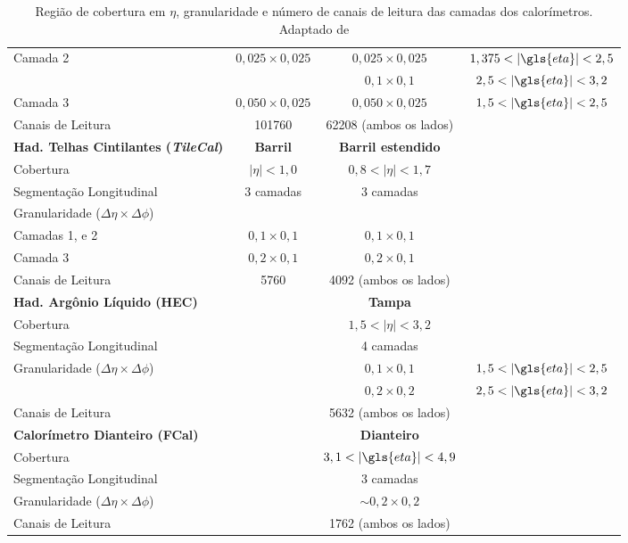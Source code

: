 \begin{table}[p]
{\begin{tabular}{p{5cm} c c c}
  Camada 2  & $0,025 \times 0,025$ & $0,025 \times 0,025$   & $1,375 <
|\gls{eta}| < 2,5$ \\
            &                      & $0,1 \times 0,1$      & $2,5   <
|\gls{eta}| < 3,2$ \\
  Camada 3  & $0,050 \times 0,025$ & $0,050 \times 0,025$  & $1,5   <
|\gls{eta}| < 2,5$ \\
  Canais de Leitura & 101760 & 62208 (ambos os lados)\\
   \hline
   \hline
  \textbf{Had. Telhas Cintilantes (\emph{TileCal})}    & \textbf{Barril}  & \textbf{Barril
estendido}     \\  \hline
  Cobertura   &  $|\eta|<1,0$ & $0,8<|\eta|<1,7$   \\
  Segmentação Longitudinal & 3 camadas  & 3 camadas  \\
  Granularidade ($\Delta \eta \times \Delta \phi$)& &  \\
  Camadas 1, e 2    &  $0,1 \times 0,1$ & $0,1 \times 0,1$   \\
  Camada 3   &  $0,2 \times 0,1$ & $0,2 \times 0,1$   \\
  Canais de Leitura & 5760 & 4092 (ambos os lados)\\
  \hline
  \hline
  \textbf{Had. Argônio Líquido (HEC)}    &  &  \textbf{Tampa}     \\  \hline
  Cobertura   &   & $1,5<|\eta|<3,2$  \\
  Segmentação Longitudinal &   & 4 camadas  \\
  Granularidade ($\Delta \eta \times \Delta \phi$)& & $0,1 \times 0,1 $ & $1,5 <
|\gls{eta}| < 2,5$ \\
  & & $0,2 \times 0,2 $ & $ 2,5 < |\gls{eta}| < 3,2$ \\
  Canais de Leitura & & 5632 (ambos os lados)\\
  \hline
  \hline
  \textbf{Calorímetro Dianteiro (FCal)}    &  &   \textbf{Dianteiro}    \\  \hline
  Cobertura   &  & $ 3,1 < |\gls{eta}| < 4,9 $ \\
  Segmentação Longitudinal &   & 3 camadas  \\
  Granularidade ($\Delta \eta \times \Delta \phi$)& & $\sim0,2 \times 0,2$  \\
  Canais de Leitura & & 1762 (ambos os lados)\\
  \hline
  \hline
\end{tabular}
}
\caption[Região de cobertura em $\eta$, granularidade e
número de canais de leitura das camadas dos calorímetros]
{Região de cobertura em $\eta$, granularidade e
número de canais de leitura das camadas dos calorímetros. Adaptado de
\cite{tese_eduardo}}
\vspace{.3cm}
\label{tab:calo}
\end{table}



